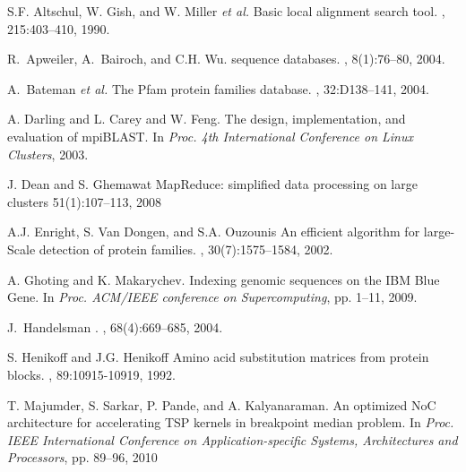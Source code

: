 \documentclass[10pt,journal,letterpaper,compsoc]{IEEEtran}
\begin{document}
\begin{thebibliography}{1}

S.F. Altschul, W. Gish, and W. Miller {\it et al.}
\newblock Basic local alignment search tool.
, 215:403--410, 1990.

R.~Apweiler, A.~Bairoch, and C.H. Wu.
 sequence databases.
, 8(1):76--80, 2004.


A.~Bateman {\it et al.}
\newblock The {Pfam} protein families database.
, 32:D138--141, 2004.


A. Darling and L. Carey and W. Feng.
\newblock The design, implementation, and evaluation of mpiBLAST.
\newblock In {\em Proc. 4th International Conference on Linux Clusters}, 2003.

J. Dean and S. Ghemawat
\newblock MapReduce: simplified data processing on large clusters
51(1):107--113, 2008

A.J. Enright, S. Van Dongen, and S.A. Ouzounis
\newblock An efficient algorithm for large-Scale detection of protein families.
, 30(7):1575--1584, 2002.


A. Ghoting and K. Makarychev.
\newblock Indexing genomic sequences on the IBM Blue Gene.
\newblock In {\em Proc. ACM/IEEE conference on Supercomputing}, pp. 1--11, 2009.

J.~Handelsman
.
, 68(4):669--685, 2004.


S. Henikoff and J.G. Henikoff
\newblock Amino acid substitution matrices from protein blocks.
, 89:10915-10919, 1992.

T. Majumder, S. Sarkar, P. Pande, and A. Kalyanaraman.
\newblock An optimized NoC architecture for accelerating TSP kernels in breakpoint median problem. 
\newblock In {\em Proc. IEEE International Conference on Application-specific Systems, Architectures and Processors}, pp. 89--96, 2010


\end{thebibliography}
\end{document}
